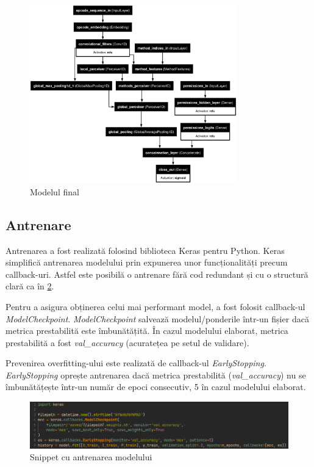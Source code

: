 \documentclass[12pt,a4paper]{report}
\begin{document}
\begin{figure}[H]
      \centering
      \includegraphics[width=0.8\textwidth]{visuals/model.png}
      \caption{Modelul final}
      \label{fig:model}
\end{figure}

\subsection{Antrenare}
Antrenarea a fost realizată folosind biblioteca Keras\cite{chollet2015keras} pentru Python.
Keras simplifică antrenarea modelului prin expunerea unor funcționalități precum callback-uri.
Astfel este posibilă o antrenare fără cod redundant și cu o structură clară ca în \cref{fig:train}.

Pentru a asigura obținerea celui mai performant model, a fost folosit callback-ul \textit{ModelCheckpoint}. 
\textit{ModelCheckpoint} salvează modelul/ponderile într-un fișier dacă metrica prestabilită este îmbunătățită.
În cazul modelului elaborat, metrica prestabilită a fost \textit{val\_accuracy} (acuratețea pe setul de validare).

Prevenirea overfitting-ului este realizată de callback-ul \textit{EarlyStopping}.
\textit{EarlyStopping} oprește antrenarea dacă metrica prestabilită (\textit{val\_accuracy}) nu se îmbunătățește într-un număr de epoci consecutiv,
5 în cazul modelului elaborat.


\begin{figure}[H]
      \centering
      \includegraphics[width=\textwidth]{visuals/train.png}
      \caption{Snippet cu antrenarea modelului}
      \label{fig:train}
\end{figure}
\end{document}

